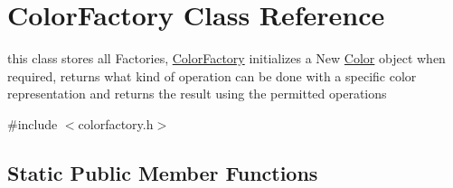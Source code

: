 \hypertarget{class_color_factory}{}\section{Color\+Factory Class Reference}
\label{class_color_factory}


this class stores all Factories, \hyperlink{class_color_factory}{Color\+Factory} initializes a New \hyperlink{class_color}{Color} object when required, returns what kind of operation can be done with a specific color representation and returns the result using the permitted operations  




{\ttfamily \#include $<$colorfactory.\+h$>$}

\subsection*{Static Public Member Functions}
